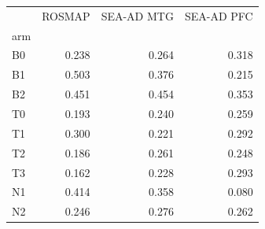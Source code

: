 \begin{tabular}{lrrr}
\toprule
 & ROSMAP & SEA-AD MTG & SEA-AD PFC \\
arm &  &  &  \\
\midrule
B0 & 0.238 & 0.264 & 0.318 \\
B1 & 0.503 & 0.376 & 0.215 \\
B2 & 0.451 & 0.454 & 0.353 \\
T0 & 0.193 & 0.240 & 0.259 \\
T1 & 0.300 & 0.221 & 0.292 \\
T2 & 0.186 & 0.261 & 0.248 \\
T3 & 0.162 & 0.228 & 0.293 \\
N1 & 0.414 & 0.358 & 0.080 \\
N2 & 0.246 & 0.276 & 0.262 \\
\bottomrule
\end{tabular}
